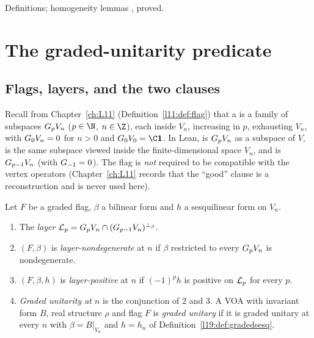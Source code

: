 \begin{status}
Definitions; homogeneity lemmas ,  proved.
\end{status}

\section{The graded-unitarity predicate}\label{l19:sec:gu}

\subsection{Flags, layers, and the two clauses}

Recall from Chapter~\ref{ch:L11} (Definition~\ref{l11:def:flag}) that a  is a family
of subspaces $G_pV_n$ ($p\in\N$, $n\in\Z$), each inside $V_n$, increasing in $p$, exhausting
$V_n$, with $G_0V_n = 0$ for $n>0$ and $\lnineteenG_0V_0 = \C\lnineteenvac$. In Lean,
 is $G_pV_n$ as a subspace of $V$,  is the same subspace
viewed inside the finite-dimensional space $V_n$, and  is
$G_{p-1}V_n$ (with $G_{-1} = 0$). The flag is \emph{not} required to be compatible
with the vertex operators (Chapter~\ref{ch:L11} records that the ``good'' clause
 is a reconstruction and is never used here).

\begin{definition}\label{l19:def:gu}
Let $F$ be a graded flag, $\beta$ a bilinear form and $h$ a sesquilinear form on $V_n$.
\begin{enumerate}
\item The \emph{layer} $\mathcal{L}_p = G_pV_n\cap(G_{p-1}V_n)^{\perp_\beta}$.
\item $(F,\beta)$ is \emph{layer-nondegenerate} at $n$ if $\beta$ restricted to every
  $G_pV_n$ is nondegenerate.
\item $(F,\beta,h)$ is \emph{layer-positive} at $n$ if $(-1)^ph$ is positive on $\mathcal{L}_p$ for
  every $p$.
\item \emph{Graded unitarity at $n$} is the conjunction of 2 and 3. A VOA with invariant form $B$, real
  structure $\rho$ and flag $F$ is \emph{graded unitary} if it is graded unitary at every $n$ with
  $\beta = B|_{V_n}$ and $h = h_n$ of Definition~\ref{l19:def:gradedsesq}.
\end{enumerate}
\end{definition}

